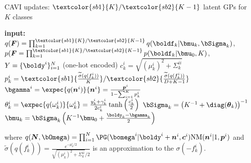 \begin{algorithm}[H]
    \caption{\ac{CAVI} updates: $\textcolor{sb1}{K}/\textcolor{sb2}{K - 1}$ latent \ac{GPs} for $K$ classes}
    \begin{algorithmic}
    \State \textbf{input:} $q(\boldsymbol{F}) = \prod_{k=1}^{\textcolor{sb1}{K}/\textcolor{sb2}{K - 1}} q(\boldf_k|\bmu_k, \bSigma_k)$, $p(\boldsymbol{F} = \prod_{k=1}^{\textcolor{sb1}{K}/\textcolor{sb2}{K - 1}} p(\boldf_k|\bmu_0, K)$, $Y=\{\boldy^i\}_{i=1}^N$ (one-hot encoded)
        \State $c^i_k = \sqrt{(\mu^i_k)^2 + \Sigma_k^{ii}}$
        \State $p^i_k = \textcolor{sb1}{\frac{\widetilde{\sigma}(q(f_k^i))}{K}}/\textcolor{sb2}{\frac{\widetilde{\sigma}(q(f_k^i))}{D + K - 1}}$
        \State $\bgamma^i = \expec{q(\boldsymbol{n}^i)}{\boldsymbol{n}^i} = \frac{\boldsymbol{p}^i}{1 - \sum_{i=1}^K p^i_k}$
        \State $\theta_k^i = \expec{q(\omega_k^i)}{\omega_k^i} = \frac{y_k^i + \gamma_k^i}{2c_k^i}\tanh\left(\frac{c_k^i}{2}\right)$
        \State $\bSigma_k = \left(K^{-1} + \diag(\boldsymbol{\theta}_k)\right)^{-1}$
        \State $\bmu_k = \bSigma_k\left(K^{-1}\bmu_0 + \frac{\boldy_k - \bgamma_k}{2}\right)$
    \EndWhile
    \end{algorithmic}
    where $q(\boldsymbol{N}, \bOmega) = \prod_{i=1}^N \PG(\bomega^i|\boldy^i + \boldsymbol{n}^i, \boldsymbol{c}^i)\mathrm{NM}(\boldsymbol{n}^i|1, \boldsymbol{p}^i)$ and $\widetilde{\sigma}(q(f_k^i)) = \frac{e^{-\mu_k^i/2}}{\sqrt{(\mu_k^i)^2 + \Sigma^{ii}_k} / 2}$ is an approximation to the $\sigma(-f^i_k)$.
    \label{alg:cavi_multiclass}
\end{algorithm}

